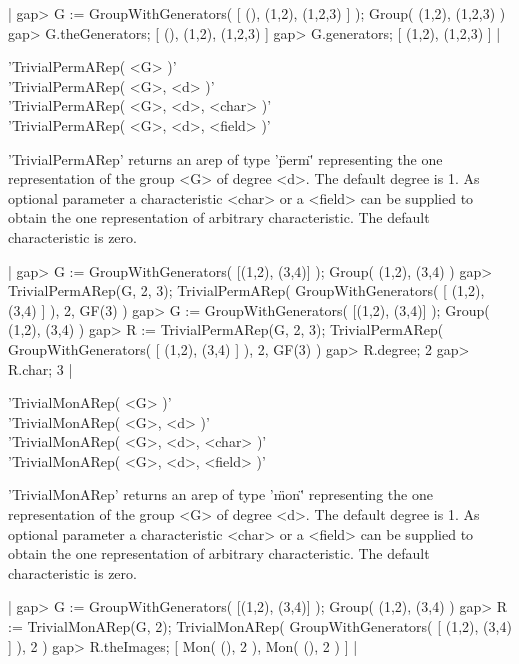 |    gap> G := GroupWithGenerators( [ (), (1,2), (1,2,3) ] );
    Group( (1,2), (1,2,3) )
    gap> G.theGenerators;
    [ (), (1,2), (1,2,3) ]
    gap> G.generators;
    [ (1,2), (1,2,3) ] |


'TrivialPermARep( <G> )'\\
'TrivialPermARep( <G>, <d> )'\\
'TrivialPermARep( <G>, <d>, <char> )'\\
'TrivialPermARep( <G>, <d>, <field> )'

'TrivialPermARep' returns an arep of type '\"perm\"' representing 
the one representation of the group <G> of degree <d>. The default
degree is 1.
As optional parameter a characteristic <char> or a <field> 
can be supplied to obtain the one representation of arbitrary 
characteristic. The default characteristic is zero.

|    gap> G := GroupWithGenerators( [(1,2), (3,4)] ); 
    Group( (1,2), (3,4) )
    gap> TrivialPermARep(G, 2, 3);
    TrivialPermARep( GroupWithGenerators( [ (1,2), (3,4) ] ), 2, GF(3) )
    gap> G := GroupWithGenerators( [(1,2), (3,4)] );
    Group( (1,2), (3,4) )
    gap> R := TrivialPermARep(G, 2, 3);
    TrivialPermARep( GroupWithGenerators( [ (1,2), (3,4) ] ), 2, GF(3) )
    gap> R.degree;
    2
    gap> R.char;
    3 |


'TrivialMonARep( <G> )'\\
'TrivialMonARep( <G>, <d> )'\\
'TrivialMonARep( <G>, <d>, <char> )'\\
'TrivialMonARep( <G>, <d>, <field> )'

'TrivialMonARep' returns an arep of type '\"mon\"' representing 
the one representation of the group <G> of degree <d>. The default
degree is 1.
As optional parameter a characteristic <char> or a <field> 
can be supplied to obtain the one representation of arbitrary 
characteristic. The default characteristic is zero.

|    gap> G := GroupWithGenerators( [(1,2), (3,4)] );
    Group( (1,2), (3,4) )
    gap> R := TrivialMonARep(G, 2);    
    TrivialMonARep( GroupWithGenerators( [ (1,2), (3,4) ] ), 2 )
    gap> R.theImages;
    [ Mon( (), 2 ), Mon( (), 2 ) ] |


